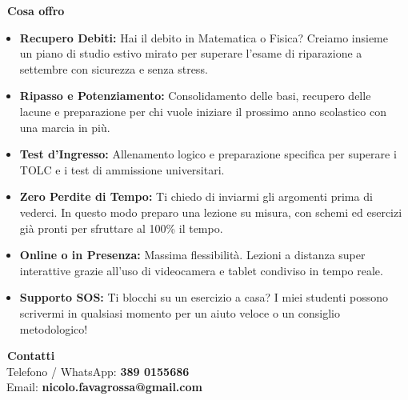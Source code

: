 \documentclass[a4paper,11pt]{article}
\begin{document}
\begin{minipage}[t]{0.62\textwidth}
    \textcolor{mainblue}{\Large \textbf{\faChalkboardTeacher\ Cosa offro}}\\[0.11cm]
    \begin{itemize}
        \item[\textcolor{accent}{\faCheckCircle}] \textbf{Recupero Debiti:} Hai il debito in Matematica o Fisica? Creiamo insieme un piano di studio estivo mirato per superare l'esame di riparazione a settembre con sicurezza e senza stress.
        \item[\textcolor{accent}{\faCheckCircle}] \textbf{Ripasso e Potenziamento:} Consolidamento delle basi, recupero delle lacune e preparazione per chi vuole iniziare il prossimo anno scolastico con una marcia in più.
        \item[\textcolor{accent}{\faCheckCircle}] \textbf{Test d'Ingresso:} Allenamento logico e preparazione specifica per superare i TOLC e i test di ammissione universitari.
        \item[\textcolor{accent}{\faCheckCircle}] \textbf{Zero Perdite di Tempo:} Ti chiedo di inviarmi gli argomenti prima di vederci. In questo modo preparo una lezione su misura, con schemi ed esercizi già pronti per sfruttare al 100\% il tempo.
        \item[\textcolor{accent}{\faCheckCircle}] \textbf{Online o in Presenza:} Massima flessibilità. Lezioni a distanza super interattive grazie all'uso di videocamera e tablet condiviso in tempo reale.
        \item[\textcolor{accent}{\faCheckCircle}] 
        \textbf{Supporto SOS:} Ti blocchi su un esercizio a casa? I miei studenti possono scrivermi in qualsiasi momento per un aiuto veloce o un consiglio metodologico!
    \end{itemize}\vspace{0.3cm}
    
    \textcolor{mainblue}{\Large \textbf{\faAddressCard\ Contatti}}\\[0.15cm]
    \faPhoneSquare\ Telefono / WhatsApp: \textbf{389 0155686}\\
    \faEnvelope\ Email: \textbf{nicolo.favagrossa@gmail.com}
    
\end{minipage}%
\hfill
\end{document}

